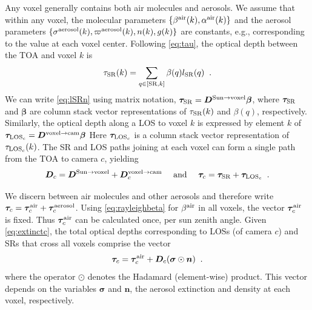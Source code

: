 \documentclass[10pt,letterpaper]{article}
\newcommand{\OpDistance}{\bm{D}}
\newcommand{\vect}[1]{\bm{#1}}
\begin{document}
Any voxel generally contains both air molecules and aerosols.  We
assume that within any voxel, the molecular parameters $\{ \beta^{\rm
  air}(k),\alpha^{\rm air}(k)\}$ and the aerosol parameters $\{
\sigma^{\rm aerosol}(k),\varpi^{\rm aerosol}(k), n(k),g(k)\}$ are constants, e.g., corresponding to the value
at each voxel center.  Following \cref{eq:tau}, the optical depth
between the TOA and voxel $k$ is
\begin{equation}
  \tau_{\rm SR}(k)= \sum_{q \in[{\rm SR},k]} \beta(q) l_{\rm SR}(q) \;\;.
  \label{eq:lSRn}
\end{equation}
We can write \cref{eq:lSRn} using matrix notation, $\vect{\tau}_{\rm
  SR}=\OpDistance^{\mathrm{Sun \rightarrow voxel}} \vect{\beta}$,
where $\vect{\tau}_{\rm SR}$ and $\vect{\beta}$ are column stack
vector representations of $\tau_{\rm SR}(k)$ and $\beta(q)$,
respectively. Similarly, the optical depth along a LOS to voxel $k$ is
expressed by element $k$ of $\vect{\tau}_{{\rm LOS}_c} =
\OpDistance^{\mathrm{voxel \rightarrow cam}} \vect{\beta}$ Here
$\vect{\tau}_{{\rm LOS}_c}$ is a column stack vector representation of
$\tau_{{\rm LOS}_c}(k)$.  The SR and LOS paths joining at each voxel
can form a single path from the TOA to camera $c$, yielding
\begin{equation}
  {\bm D}_c=
  {\bm D}^{\mathrm{Sun \rightarrow voxel}}+
  {\bm D}^{\mathrm{voxel \rightarrow cam}}_c
  \quad\text{ and }\quad
  \vect{\tau}_c=
  \vect{\tau}_{\rm SR}+
  \vect{\tau}_{{\rm LOS}_c}
  \;\;.
  \label{eq:D_tau_total}
\end{equation}

We discern between air molecules and other aerosols and therefore
write $ \vect{\tau}_c= \vect{\tau}_c^{\rm air} + \vect{\tau}_c^{\rm
  aerosol}$.  Using \cref{eq:rayleighbeta} for $\beta^{\rm air}$ in
all voxels, the vector $\vect{\tau}_c^{\rm air}$ is fixed. Thus
$\vect{\tau}_c^{\rm air}$ can be calculated once, per sun zenith
angle. Given \cref{eq:extinctc}, the total optical depths
corresponding to LOSs (of camera $c$) and SRs that cross all voxels
comprise the vector
\begin{equation}
  \vect{\tau}_c= \vect{\tau}_c^{\rm air}
  + {\bm D}_c (\vect{\sigma} \odot {\bm n})
  \;\;.
  \label{eq:tautotal}
\end{equation}
where the operator $\odot$ denotes the Hadamard (element-wise)
product. This vector depends on the variables $\vect{\sigma}$ and
${\bm n}$, the aerosol extinction and density at each voxel,
respectively.

\end{document}
